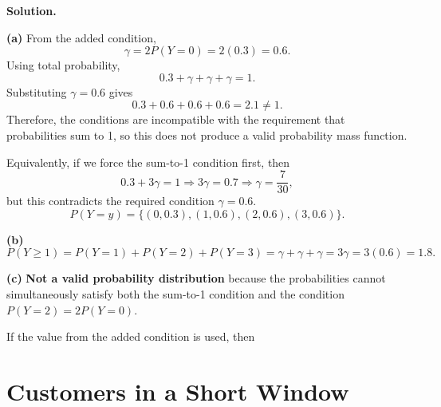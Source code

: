 		\textbf{Solution.}

		\textbf{(a)} From the added condition,
		\[
		\gamma=2P(Y=0)=2(0.3)=0.6.
		\]
		Using total probability,
		\[
		0.3+\gamma+\gamma+\gamma=1.
		\]
		Substituting $\gamma=0.6$ gives
		\[
		0.3+0.6+0.6+0.6=2.1\neq 1.
		\]
		Therefore, the conditions are incompatible with the requirement that probabilities sum to 1, so this does not produce a valid probability mass function.
		
		Equivalently, if we force the sum-to-1 condition first, then
		\[
		0.3+3\gamma=1\Rightarrow 3\gamma=0.7\Rightarrow \gamma=\frac{7}{30},
		\]
		but this contradicts the required condition $\gamma=0.6$.
		\[
		P(Y=y)=\{(0,0.3),(1,0.6),(2,0.6),(3,0.6)\}.
		\]
		\begin{center}
		\end{center}
		
		

		\textbf{(b)}
		\[
		P(Y\ge 1)=P(Y=1)+P(Y=2)+P(Y=3)=\gamma+\gamma+\gamma=3\gamma=3(0.6)=1.8.
		\]
		\begin{center}
		\end{center}
		\textbf{(c)} \textbf{Not a valid probability distribution} because the probabilities cannot simultaneously satisfy both the sum-to-1 condition and the condition $P(Y=2)=2P(Y=0)$.
		
		If the value from the added condition is used, then

		
		\section{Customers in a Short Window}
		
